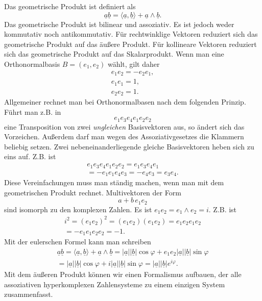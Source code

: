 \documentclass[a4paper,10pt,fleqn,twocolumn,twoside]{article}
\begin{document}
Das geometrische Produkt ist definiert als
\[\underline a\underline b =
\langle\underline a,\underline b\rangle
+\underline a\wedge\underline b.\]
\noindent
Das geometrische Produkt ist bilinear und assoziativ. Es ist jedoch
weder kommutativ noch antikommutativ.
Für rechtwinklige Vektoren reduziert sich das geometrische Produkt
auf das äußere Produkt. Für kollineare Vektoren reduziert sich das
geometrische Produkt auf das Skalarprodukt.
Wenn man eine Orthonormalbasis \(B=(e_1,e_2)\) wählt, gilt daher
\begin{gather*}
e_1e_2 = -e_2e_1,\\
e_1e_1=1,\\
e_2e_2=1.
\end{gather*}
\noindent
Allgemeiner rechnet man bei Orthonormalbasen nach dem folgenden
Prinzip. Führt man z.B. in
\[e_1e_3e_4e_1e_2e_2\]
eine Transposition von zwei \textit{ungleichen} Basisvektoren aus,
so ändert sich das Vorzeichen. Außerdem darf
man wegen des Assoziativgesetzes die Klammern beliebig setzen.
Zwei nebeneinanderliegende gleiche Basisvektoren heben sich zu
eins auf. Z.B. ist
\begin{gather*}
e_1e_3e_4e_1e_2e_2 = e_1e_3e_4e_1\\
= -e_1e_1e_4e_3 = -e_4e_3 = e_3e_4.
\end{gather*}
Diese Vereinfachungen muss man ständig machen, wenn man mit dem
geometrischen Produkt rechnet. Multivektoren der Form
\[a+b\,e_1e_2\]
sind isomorph zu den komplexen Zahlen.
Es ist \(e_1e_2 = e_1\wedge e_2 = i\). Z.B. ist
\begin{gather*}
i^2 = (e_1e_2)^2 = (e_1e_2)(e_1e_2) = e_1e_2e_1e_2\\
= -e_1e_1e_2e_2 = -1.
\end{gather*}
\noindent
Mit der eulerschen Formel kann man schreiben
\begin{gather*}
\underline a\underline b =
\langle\underline a,\underline b\rangle
+\underline a\wedge\underline b
= |\underline a||\underline b|\cos\varphi
+ e_1e_2|\underline a||\underline b|\sin\varphi\\
= |\underline a||\underline b|\cos\varphi
+ i|\underline a||\underline b|\sin\varphi
= |\underline a||\underline b|e^{i\varphi}.
\end{gather*}
\noindent
Mit dem äußeren Produkt können wir einen Formalismus aufbauen,
der alle assoziativen hyperkomplexen Zahlensysteme zu einem
einzigen System zusammenfasst.
\end{document}
